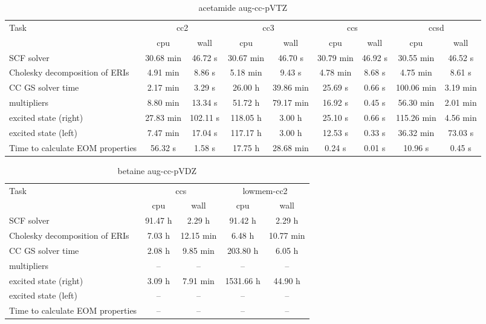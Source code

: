 \documentclass{article}
\begin{document}
\begin{table}
\caption{acetamide aug-cc-pVTZ}
\begin{tabular}{lcccccccc}
\toprule
Task & \multicolumn{2}{c}{cc2} & \multicolumn{2}{c}{cc3} & \multicolumn{2}{c}{ccs} & \multicolumn{2}{c}{ccsd}\\
\cmidrule(lr){2-3}\cmidrule(lr){4-5}\cmidrule(lr){6-7}\cmidrule(lr){8-9}
 & cpu & wall & cpu & wall & cpu & wall & cpu & wall\\
\midrule
SCF solver & 30.68 min & 46.72 s & 30.67 min & 46.70 s & 30.79 min & 46.92 s & 30.55 min & 46.52 s\\
Cholesky decomposition of ERIs & 4.91 min & 8.86 s & 5.18 min & 9.43 s & 4.78 min & 8.68 s & 4.75 min & 8.61 s\\
CC GS solver time & 2.17 min & 3.29 s & 26.00 h & 39.86 min & 25.69 s & 0.66 s & 100.06 min & 3.19 min\\
multipliers & 8.80 min & 13.34 s & 51.72 h & 79.17 min & 16.92 s & 0.45 s & 56.30 min & 2.01 min\\
excited state (right) & 27.83 min & 102.11 s & 118.05 h & 3.00 h & 25.10 s & 0.66 s & 115.26 min & 4.56 min\\
excited state (left) & 7.47 min & 17.04 s & 117.17 h & 3.00 h & 12.53 s & 0.33 s & 36.32 min & 73.03 s\\
Time to calculate EOM properties & 56.32 s & 1.58 s & 17.75 h & 28.68 min & 0.24 s & 0.01 s & 10.96 s & 0.45 s\\
\bottomrule
\end{tabular}
\end{table}
\begin{table}
\caption{betaine aug-cc-pVDZ}
\begin{tabular}{lcccc}
\toprule
Task & \multicolumn{2}{c}{ccs} & \multicolumn{2}{c}{lowmem-cc2}\\
\cmidrule(lr){2-3}\cmidrule(lr){4-5}
 & cpu & wall & cpu & wall\\
\midrule
SCF solver & 91.47 h & 2.29 h & 91.42 h & 2.29 h\\
Cholesky decomposition of ERIs & 7.03 h & 12.15 min & 6.48 h & 10.77 min\\
CC GS solver time & 2.08 h & 9.85 min & 203.80 h & 6.05 h\\
multipliers & -- & -- & -- & --\\
excited state (right) & 3.09 h & 7.91 min & 1531.66 h & 44.90 h\\
excited state (left) & -- & -- & -- & --\\
Time to calculate EOM properties & -- & -- & -- & --\\
\bottomrule
\end{tabular}
\end{table}
\end{document}
